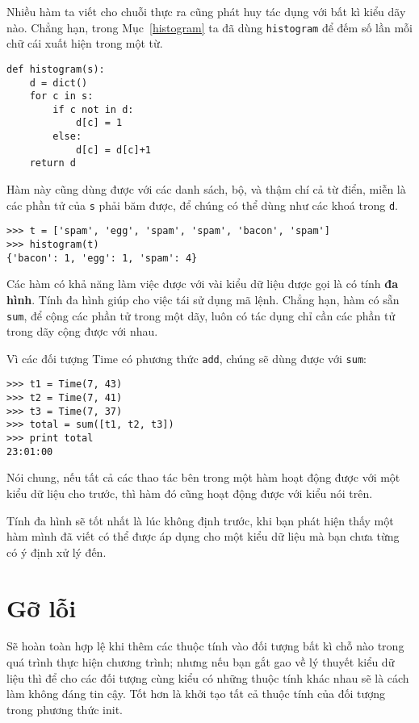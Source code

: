 \documentclass[11pt]{book}
\begin{document}

Nhiều hàm ta viết cho chuỗi thực ra cũng phát huy tác dụng
với bất kì kiểu dãy nào.
Chẳng hạn, trong Mục~\ref{histogram}
ta đã dùng {\tt histogram} để đếm số lần mỗi chữ cái
xuất hiện trong một từ.

\beforeverb
\begin{verbatim}
def histogram(s):
    d = dict()
    for c in s:
        if c not in d:
            d[c] = 1
        else:
            d[c] = d[c]+1
    return d
\end{verbatim}
\afterverb
%
Hàm này cũng dùng được với các danh sách, bộ, và thậm chí cả từ điển,
miễn là các phần tử của {\tt s} phải băm được, để chúng có thể dùng như 
các khoá trong {\tt d}.

\beforeverb
\begin{verbatim}
>>> t = ['spam', 'egg', 'spam', 'spam', 'bacon', 'spam']
>>> histogram(t)
{'bacon': 1, 'egg': 1, 'spam': 4}
\end{verbatim}
\afterverb
%
Các hàm có khả năng làm việc được với vài kiểu dữ liệu được gọi là có tính {\bf đa hình}.
Tính đa hình giúp cho việc tái sử dụng mã lệnh. Chẳng hạn, hàm có sẵn 
{\tt sum}, để cộng các phần tử trong một dãy, luôn có tác dụng chỉ cần
các phần tử trong dãy cộng được với nhau.


Vì các đối tượng Time có phương thức {\tt add}, chúng sẽ dùng được
với {\tt sum}:

\beforeverb
\begin{verbatim}
>>> t1 = Time(7, 43)
>>> t2 = Time(7, 41)
>>> t3 = Time(7, 37)
>>> total = sum([t1, t2, t3])
>>> print total
23:01:00
\end{verbatim}
\afterverb
%
Nói chung, nếu tất cả các thao tác bên trong một hàm hoạt động
được với một kiểu dữ liệu cho trước, thì hàm đó cũng hoạt động
được với kiểu nói trên.

Tính đa hình sẽ tốt nhất là lúc không định trước, khi 
bạn phát hiện thấy một hàm mình đã viết có thể được
áp dụng cho một kiểu dữ liệu mà bạn chưa từng có ý định xử lý đến.


\section{Gỡ lỗi}

Sẽ hoàn toàn hợp lệ khi thêm các thuộc tính vào đối tượng bất kì
chỗ nào trong quá trình thực hiện chương trình; nhưng nếu bạn gắt gao
về lý thuyết kiểu dữ liệu thì để cho các đối tượng cùng kiểu có những
thuộc tính khác nhau sẽ là cách làm không đáng tin cậy. Tốt hơn
là khởi tạo tất cả thuộc tính của đối tượng trong phương thức init.
\end{document}
